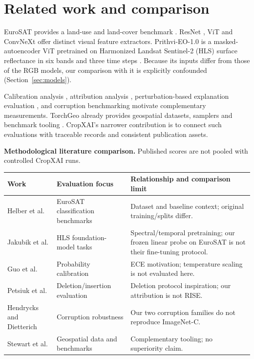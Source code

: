 \documentclass[3p,times,procedia]{elsarticle}
\begin{document}
\section{Related work and comparison}\label{sec:related}
EuroSAT provides a land-use and land-cover benchmark \cite{eurosat}. ResNet \cite{resnet}, ViT \cite{vit} and ConvNeXt \cite{convnext} offer distinct visual feature extractors. Prithvi-EO-1.0 is a masked-autoencoder ViT pretrained on Harmonized Landsat Sentinel-2 (HLS) surface reflectance in six bands and three time steps \cite{prithvi,prithvicard,hls,mae}. Because its inputs differ from those of the RGB models, our comparison with it is explicitly confounded (Section~\ref{sec:models}).

Calibration analysis \cite{calibration}, attribution analysis \cite{attribution,gradcam}, perturbation-based explanation evaluation \cite{rise}, and corruption benchmarking \cite{corruptions} motivate complementary measurements. TorchGeo already provides geospatial datasets, samplers and benchmark tooling \cite{torchgeo}. CropXAI's narrower contribution is to connect such evaluations with traceable records and consistent publication assets.

\begin{center}\small
\textbf{Methodological literature comparison.} Published scores are not pooled with controlled CropXAI runs.\par\medskip
\begin{tabular}{p{.23\linewidth}p{.29\linewidth}p{.39\linewidth}}\toprule
Work & Evaluation focus & Relationship and comparison limit\\\midrule
Helber et al. \cite{eurosat} & EuroSAT classification benchmarks & Dataset and baseline context; original training/splits differ.\\
Jakubik et al. \cite{prithvi} & HLS foundation-model tasks & Spectral/temporal pretraining; our frozen linear probe on EuroSAT is not their fine-tuning protocol.\\
Guo et al. \cite{calibration} & Probability calibration & ECE motivation; temperature scaling is not evaluated here.\\
Petsiuk et al. \cite{rise} & Deletion/insertion evaluation & Deletion protocol inspiration; our attribution is not RISE.\\
Hendrycks and Dietterich \cite{corruptions} & Corruption robustness & Our two corruption families do not reproduce ImageNet-C.\\
Stewart et al. \cite{torchgeo} & Geospatial data and benchmarks & Complementary tooling; no superiority claim.\\\bottomrule
\end{tabular}\end{center}
\end{document}
